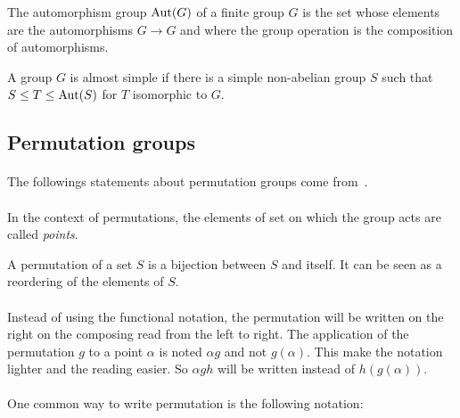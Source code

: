 \begin{definition}
  The automorphism group $\operatorname{Aut}(G)$ of a finite group $G$ is the set whose elements are the automorphisms $G \to G$ and where the group operation is the composition of automorphisms.
\end{definition}

\begin{definition}
  A group $G$ is almost simple if there is a simple non-abelian group $S$ such that $S \le T \le \operatorname{Aut}(S)$ for $T$ isomorphic to $G$.
\end{definition}

\subsection{Permutation groups}

\paragraph{}
The followings statements about permutation groups come from~\cite{cameronPermutationGroups}.

\paragraph{}
In the context of permutations, the elements of set on which the group acts are called \textit{points}.

\begin{definition}[Permutation]
  A permutation of a set $S$ is a bijection between $S$ and itself. It can be seen as a reordering of the elements of $S$.
\end{definition}

\paragraph{}
Instead of using the functional notation, the permutation will be written on the right on the composing read from the left to right. The application of the permutation $g$ to a point $\alpha$ is noted $\alpha g$ and not $g(\alpha)$. This make the notation lighter and the reading easier. So $\alpha gh$ will be written instead of $h(g(\alpha))$.

\paragraph{}
One common way to write permutation is the following notation:

